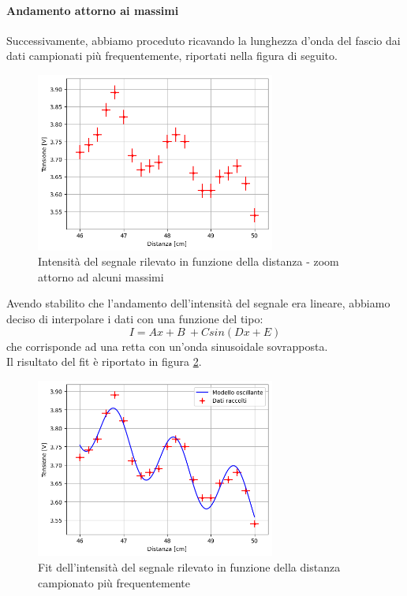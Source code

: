 \documentclass[letterpaper,12pt]{article}
\begin{document}
\paragraph*{Andamento attorno ai massimi}
Successivamente, abbiamo proceduto ricavando la lunghezza d'onda del fascio dai dati campionati più frequentemente, riportati nella figura di seguito.

\begin{figure}[h!]
	\centering
	\includegraphics[width = 0.7\textwidth]{dati_distanza_ondulatori.png}
	\caption{Intensità del segnale rilevato in funzione della distanza - zoom attorno ad alcuni massimi}
	\label{fig:distanza_zoom}
\end{figure}

Avendo stabilito che l'andamento dell'intensità del segnale era lineare, abbiamo deciso di interpolare i dati con una funzione del tipo:
\begin{equation}
	I = Ax + B\ + Csin(Dx + E)
	\label{eq:modello_oscillante}
\end{equation}
che corrisponde ad una retta con un'onda sinusoidale sovrapposta.\\
Il risultato del fit è riportato in figura \ref{fig:fit_distanza_ondulatori}.

\begin{figure}[h!]
	\centering
	\includegraphics[width = 0.7\textwidth]{fit_distanza_ondulatori.png}
	\caption{Fit dell'intensità del segnale rilevato in funzione della distanza campionato più frequentemente}
	\label{fig:fit_distanza_ondulatori}
\end{figure}
\end{document}
